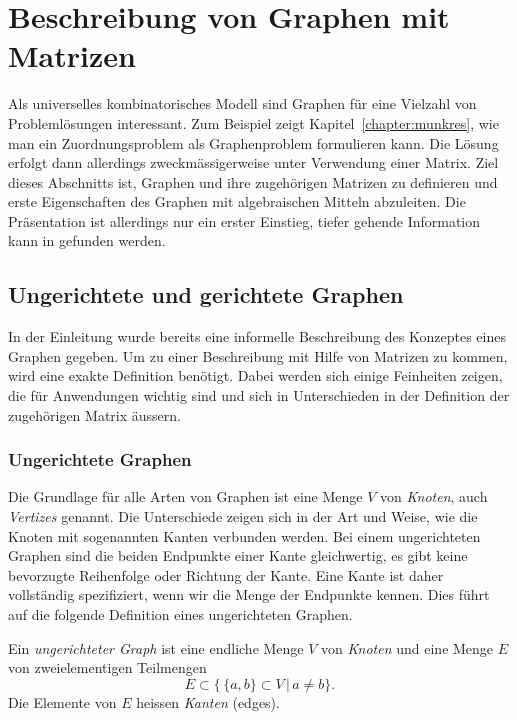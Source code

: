 %
%
%
\section{Beschreibung von Graphen mit Matrizen
\label{buch:section:beschreibung-von-graphen-mit-matrizen}}
Als universelles kombinatorisches Modell sind Graphen für eine
Vielzahl von Problemlösungen interessant.
Zum Beispiel zeigt Kapitel~\ref{chapter:munkres}, wie man
ein Zuordnungsproblem als Graphenproblem formulieren kann.
Die Lösung erfolgt dann allerdings zweckmässigerweise unter
Verwendung einer Matrix.
Ziel dieses Abschnitts ist, Graphen und ihre zugehörigen Matrizen
zu definieren und erste Eigenschaften des Graphen mit algebraischen
Mitteln abzuleiten.
Die Präsentation ist allerdings nur ein erster Einstieg, tiefer
gehende Information kann in \cite{skript:brualdi} gefunden werden.

\subsection{Ungerichtete und gerichtete Graphen
\label{subsection:definition-von-graphen}}
In der Einleitung wurde bereits eine informelle
Beschreibung des Konzeptes eines Graphen gegeben.
Um zu einer Beschreibung mit Hilfe von Matrizen zu kommen,
wird eine exakte Definition benötigt.
Dabei werden sich einige Feinheiten zeigen, die für Anwendungen wichtig
sind und sich in Unterschieden in der Definition der zugehörigen Matrix 
äussern.

\subsubsection{Ungerichtete Graphen}
Die Grundlage für alle Arten von Graphen ist eine Menge $V$ von {\em Knoten},
auch {\em Vertizes} genannt.
%
%
Die Unterschiede zeigen sich in der Art und Weise, wie die Knoten
mit sogenannten Kanten
%
verbunden werden.
Bei einem ungerichteten Graphen sind die beiden Endpunkte einer Kante
gleichwertig, es gibt keine bevorzugte Reihenfolge oder Richtung der
Kante.
Eine Kante ist daher vollständig spezifiziert, wenn wir die
Menge der Endpunkte kennen.
Dies führt auf die folgende Definition eines ungerichteten Graphen.

\begin{definition}
\label{buch:def:ungerichteter-graph}
%
%
Ein {\em ungerichteter Graph} ist eine endliche Menge $V$ von {\em Knoten}
und eine Menge $E$ von zweielementigen Teilmengen 
\[
E \subset \{\, \{a,b\}\subset V\,|\, a\ne b\}.
\]
Die Elemente von $E$ heissen {\em Kanten} (edges).
\end{definition}

